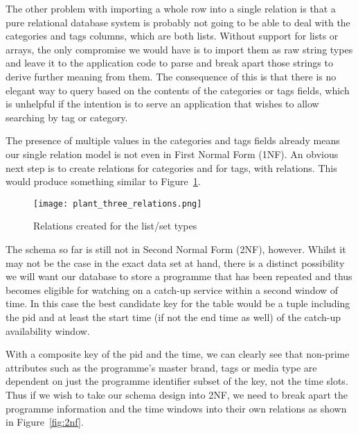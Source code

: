 \documentclass[11pt,a4paper]{article}
\begin{document}
The other problem with importing a whole row into a single relation is that
a pure relational database system is probably not going to be able to deal
with the categories and tags columns, which are both lists. Without support
for lists or arrays, the only compromise we would have is to import them
as raw string types and leave it to the application code to parse and break
apart those strings to derive further meaning from them. The consequence of
this is that there is no elegant way to query based on the contents of
the categories or tags fields, which is unhelpful if the intention is to
serve an application that wishes to allow searching by tag or category.

The presence of multiple values in the categories and tags fields already
means our single relation model is not even in First Normal Form (1NF).
\cite{codd1972further}
An obvious next step is to create relations for categories and for tags,
with relations. This would produce something similar to
Figure~\ref{fig:cat-tags-rel}.

\begin{comment}
  @startuml plant_three_relations.png
  class Programme {
    pid
    start_time
    end_time
    epoch_start
    epoch_end
    complete_title
    media_type
    masterbrand
    service
    brand_pid
    is_clip
  }
  class Category {
    id
    level
    title
  }
  class Tag {
    title
  }
  Programme "0..*" -r- "0..*" Category
  Programme "0..*" -l- "0..*" Tag
  @enduml
\end{comment}
\begin{figure}[p]
  \begin{center}
    \texttt{[image: plant\_three\_relations.png]}
  \end{center}
  \caption{Relations created for the list/set types}
  \label{fig:cat-tags-rel}
\end{figure}

The schema so far is still not in Second Normal Form (2NF),
however. Whilst it may not be the case in the exact data set
at hand, there is a distinct possibility we will want our database
to store a programme that has been repeated and thus becomes eligible
for watching on a catch-up service within a second window of time.
In this case the best candidate key for the table would be a tuple
including the pid and at least the start time (if not the end time
as well) of the catch-up availability window.

With a composite key of the pid and the time, we can clearly see
that non-prime attributes such as the programme's master brand, tags
or media type are dependent on just the programme identifier subset
of the key, not the time slots. Thus if we wish to take our schema
design into 2NF, we need to break apart the programme information
and the time windows into their own relations as shown in
Figure~\ref{fig:2nf}.
\end{document}
